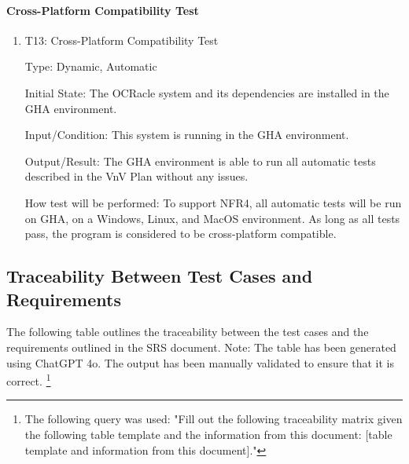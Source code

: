 \documentclass[12pt, titlepage]{article}
\begin{document}
\paragraph{Cross-Platform Compatibility Test}

\begin{enumerate}

\item{T13: Cross-Platform Compatibility Test\\}

Type: Dynamic, Automatic
					
Initial State: The OCRacle system and its dependencies are installed in the
GHA environment.
					
Input/Condition: This system is running in the GHA environment.
					
Output/Result: The GHA environment is able to run all automatic tests described
in the VnV Plan without any issues.
					
How test will be performed: To support NFR4, all automatic tests will be run on
GHA, on a Windows, Linux, and MacOS environment. As long as all tests pass, the
program is considered to be cross-platform compatible.

\end{enumerate}

\subsection{Traceability Between Test Cases and Requirements}

The following table outlines the traceability between the test cases and the
requirements outlined in the SRS document. Note: The table has been generated
using ChatGPT 4o. The output has been manually validated to ensure that it is
correct. \footnote{The following query was used: "Fill out the following traceability
matrix given the following table template and the information from this document: [table template and information from this document]."}
\end{document}
